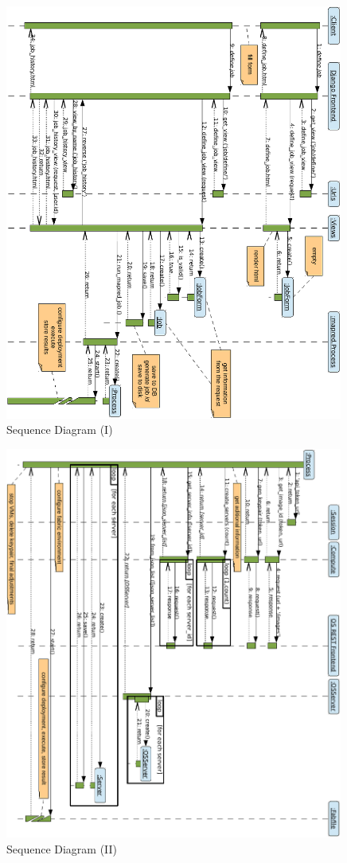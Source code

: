 \begin{figure}[tbp]
\begin{center}
\includegraphics[width=0.99\textwidth]{imagenes/033.pdf}
 \caption{Sequence Diagram (I)}
\label{fig:secuencia1}
\end{center}
\end{figure}

\begin{figure}[tbp]
\begin{center}
\includegraphics[width=0.99\textwidth]{imagenes/034.pdf}
 \caption{Sequence Diagram (II)}
\label{fig:secuencia2}
\end{center}
\end{figure}

